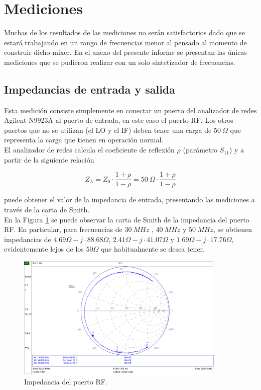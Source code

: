 \documentclass[a4paper,10pt]{article}
\begin{document}
	\section{Mediciones}
	\indent Muchas de los resultados de las mediciones no serán satisfactorios 
	dado que se estará trabajando en un rango de frecuencias menor al pensado al
	momento de construir dicho mixer. En el anexo del presente informe se 
	presentan las únicas mediciones que se pudieron realizar con un solo 
	sintetizador de frecuencias.

	\subsection{Impedancias de entrada y salida}
	\indent Esta medici\'on consiste simplemente en conectar un puerto del 
	analizador de redes Agilent N9923A al puerto de entrada, en este caso el 
	puerto RF. Los otros puertos que no se utilizan (el LO y el IF) deben tener 
	una carga de $50~\Omega$ que representa la carga que tienen en operaci\'on 
	normal. \\
	\indent El analizador de redes calcula el coeficiente de reflexi\'on $\rho$ 
	(par\'ametro $S_{11}$) y a partir de la siguiente relaci\'on
	
	$$Z_L =Z_0\cdot\frac{1+\rho}{1-\rho}=50~\Omega\cdot\frac{1+\rho}{1-\rho}$$
	
	puede obtener el valor de la impedancia de entrada, presentando las 
	mediciones a trav\'es de la carta de Smith. \\
	\indent En la Figura \ref{impedancia1} se puede observar la carta de Smith 
	de la impedancia del puerto RF. En particular, para  frecuencias de $30~MHz$
	, $40~MHz$ y $50~MHz$, se obtienen impedancias de 
	$4.69\Omega-j\cdot88.68\Omega$, $2.41\Omega-j\cdot41.07\Omega$ y 
	$1.69\Omega-j\cdot17.76\Omega$, evidentemente lejos de los $50\Omega$ que 
	habitualmente se desea tener.	
	
	\begin{figure}[!htb]
		\centering
		\includegraphics[width=10cm]{Images/impedanciaRF.png}
		\caption{Impedancia del puerto RF.}
		\label{impedancia1}
	\end{figure}
	
\end{document}
